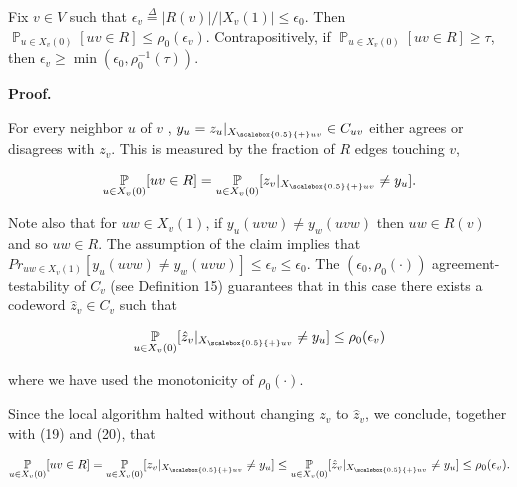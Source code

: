 Fix $v\in V$ such that
$\epsilon_{v}\stackrel{{\scriptstyle\Delta}}{{=}}|R(v)|/|X_{v}(1)|\leq\epsilon_{0}$. Then $\operatorname*{\mathbb{P}}_{u\in X_{v}(0)}[uv\in R]\leq\rho_{0}(\epsilon_{v})$.
Contrapositively, if $\operatorname*{\mathbb{P}}_{u\in X_{v}(0)}[uv\in R]\geq\tau$, then $\epsilon_{v}\geq\min(\epsilon_{0},\rho_{0}^{-1}(\tau))$.\par







\par\medskip\noindent\textbf{
\textbf{Proof}.}\par




For every neighbor $u$ of $v$ , $y_{u}=z_{u}|_{{X}_{\scalebox{0.5}{+}uv}}\in C_{uv}$ either agrees or disagrees with $z_{v}$. This is measured by the fraction of $R$ edges touching $v$,\par


\[\begin{gathered}
\operatorname*{\mathbb{P}}_{u\in X_{v}(0)}[uv\in R]=\operatorname*{\mathbb{P}}_{u\in X_{v}(0)}[z_{v}|_{{X}_{\scalebox{0.5}{+}uv}}\neq y_{u}].
\end{gathered}\]


Note also that for $uw\in X_{v}(1)$, if $y_{u}(uvw)\neq y_{w}(uvw)$ then $uw\in R(v)$ and so $uw\in R$. The assumption of the claim implies that $Pr_{uw\in X_{v}(1)}[y_{u}(uvw)\neq y_{w}(uvw)]\leq\epsilon_{v}\leq\epsilon_{0}$.
The $(\epsilon_{0},\rho_{0}(\cdot))$ agreement-testability of $C_{v}$ (see Definition 15) guarantees that in this case there exists a codeword $\hat{z}_{v}\in C_{v}$ such that\par


\[\begin{gathered}
\operatorname*{\mathbb{P}}_{u\in X_{v}(0)}[\hat{z}_{v}|_{{X}_{\scalebox{0.5}{+}uv}}\neq y_{u}]\leq\rho_{0}(\epsilon_{v})
\end{gathered}\]


where we have used the monotonicity of $\rho_{0}(\cdot)$.\par




Since the local algorithm halted without changing $z_{v}$ to $\hat{z}_{v}$, we conclude, together with (19) and (20), that\par


\[\begin{gathered}
\operatorname*{\mathbb{P}}_{u\in X_{v}(0)}[uv\in R]=\operatorname*{\mathbb{P}}_{u\in X_{v}(0)}[z_{v}|_{{X}_{\scalebox{0.5}{+}uv}}\neq y_{u}]\leq\operatorname*{\mathbb{P}}_{u\in X_{v}(0)}[\hat{z}_{v}|_{{X}_{\scalebox{0.5}{+}uv}}\neq y_{u}]\leq\rho_{0}(\epsilon_{v}).
\end{gathered}\]



